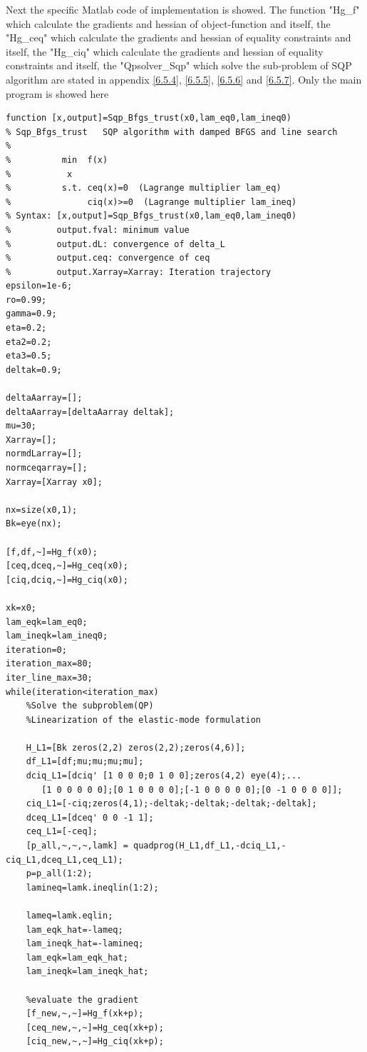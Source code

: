 Next the specific Matlab code of implementation is showed. The function "Hg_f" which calculate the gradients and hessian of object-function and itself, the "Hg_ceq" which calculate the gradients and hessian of equality constraints and itself, the "Hg_ciq" which calculate the gradients and hessian of equality constraints and itself, the "Qpsolver_Sqp" which solve the sub-problem of SQP algorithm are stated in appendix \ref{6.5.4}, \ref{6.5.5}, \ref{6.5.6} and \ref{6.5.7}. Only the main program is showed here

{\setmainfont{Courier New Bold} \scriptsize         
\begin{lstlisting}
function [x,output]=Sqp_Bfgs_trust(x0,lam_eq0,lam_ineq0)
% Sqp_Bfgs_trust   SQP algorithm with damped BFGS and line search
%
%          min  f(x)
%           x
%          s.t. ceq(x)=0  (Lagrange multiplier lam_eq)    
%               ciq(x)>=0  (Lagrange multiplier lam_ineq)  
% Syntax: [x,output]=Sqp_Bfgs_trust(x0,lam_eq0,lam_ineq0)
%         output.fval: minimum value
%         output.dL: convergence of delta_L
%         output.ceq: convergence of ceq
%         output.Xarray=Xarray: Iteration trajectory  
epsilon=1e-6;
ro=0.99;
gamma=0.9;
eta=0.2;
eta2=0.2;
eta3=0.5;
deltak=0.9;

deltaAarray=[];
deltaAarray=[deltaAarray deltak];
mu=30;
Xarray=[];
normdLarray=[];
normceqarray=[];
Xarray=[Xarray x0];

nx=size(x0,1);
Bk=eye(nx);

[f,df,~]=Hg_f(x0);
[ceq,dceq,~]=Hg_ceq(x0);
[ciq,dciq,~]=Hg_ciq(x0);

xk=x0;
lam_eqk=lam_eq0;
lam_ineqk=lam_ineq0;
iteration=0;
iteration_max=80;
iter_line_max=30;
while(iteration<iteration_max)
    %Solve the subproblem(QP)
    %Linearization of the elastic-mode formulation
    
    H_L1=[Bk zeros(2,2) zeros(2,2);zeros(4,6)];
    df_L1=[df;mu;mu;mu;mu];
    dciq_L1=[dciq' [1 0 0 0;0 1 0 0];zeros(4,2) eye(4);...
       [1 0 0 0 0 0];[0 1 0 0 0 0];[-1 0 0 0 0 0];[0 -1 0 0 0 0]];
    ciq_L1=[-ciq;zeros(4,1);-deltak;-deltak;-deltak;-deltak];
    dceq_L1=[dceq' 0 0 -1 1];
    ceq_L1=[-ceq];
    [p_all,~,~,~,lamk] = quadprog(H_L1,df_L1,-dciq_L1,-ciq_L1,dceq_L1,ceq_L1);
    p=p_all(1:2);
    lamineq=lamk.ineqlin(1:2); 
    
    lameq=lamk.eqlin;
    lam_eqk_hat=-lameq;
    lam_ineqk_hat=-lamineq;
    lam_eqk=lam_eqk_hat;
    lam_ineqk=lam_ineqk_hat;
    
    %evaluate the gradient
    [f_new,~,~]=Hg_f(xk+p);
    [ceq_new,~,~]=Hg_ceq(xk+p);
    [ciq_new,~,~]=Hg_ciq(xk+p);
    

\end{lstlisting}}
